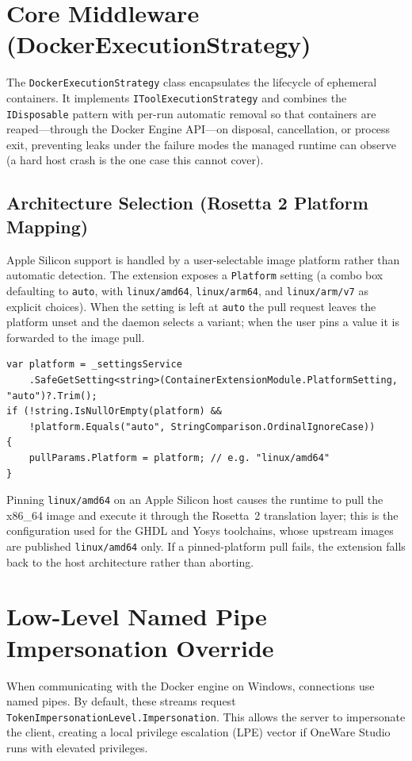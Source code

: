 \section{Core Middleware (DockerExecutionStrategy)}
The \texttt{Docker\-Execution\-Strategy} class encapsulates the lifecycle of ephemeral containers. It implements \texttt{ITool\-Execution\-Strategy} and combines the \texttt{IDisposable} pattern with per-run automatic removal so that containers are reaped---through the Docker Engine API---on disposal, cancellation, or process exit, preventing leaks under the failure modes the managed runtime can observe (a hard host crash is the one case this cannot cover).

\subsection{Architecture Selection (Rosetta 2 Platform Mapping)}
Apple Silicon support is handled by a user-selectable image platform rather than automatic detection. The extension exposes a \texttt{Platform} setting (a combo box defaulting to \texttt{auto}, with \texttt{linux/amd64}, \texttt{linux/arm64}, and \texttt{linux/arm/v7} as explicit choices). When the setting is left at \texttt{auto} the pull request leaves the platform unset and the daemon selects a variant; when the user pins a value it is forwarded to the image pull.
\begin{lstlisting}[language=CSharp, caption={Settings-driven platform resolution}, label={lst:arch}]
var platform = _settingsService
    .SafeGetSetting<string>(ContainerExtensionModule.PlatformSetting, "auto")?.Trim();
if (!string.IsNullOrEmpty(platform) &&
    !platform.Equals("auto", StringComparison.OrdinalIgnoreCase))
{
    pullParams.Platform = platform; // e.g. "linux/amd64"
}
\end{lstlisting}
Pinning \texttt{linux/amd64} on an Apple Silicon host causes the runtime to pull the x86\_64 image and execute it through the Rosetta~2 translation layer; this is the configuration used for the GHDL and Yosys toolchains, whose upstream images are published \texttt{linux/amd64} only. If a pinned-platform pull fails, the extension falls back to the host architecture rather than aborting.

\section{Low-Level Named Pipe Impersonation Override}
When communicating with the Docker engine on Windows, connections use named pipes. By default, these streams request \texttt{Token\-Impersonation\-Level.}\allowbreak\texttt{Impersonation}. This allows the server to impersonate the client, creating a local privilege escalation (LPE) vector if OneWare Studio runs with elevated privileges.

